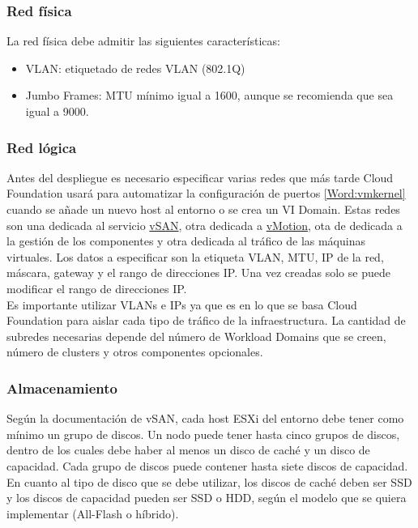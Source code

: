 \subsubsection{Red física}
\label{subsubsec:redFisica}
La red física debe admitir las siguientes características:
\begin{itemize}
    \item VLAN: etiquetado de redes VLAN (802.1Q)
    \item Jumbo Frames: MTU mínimo igual a 1600, aunque se recomienda que sea igual a 9000.
\end{itemize}

\subsubsection{Red lógica}
\label{subsubsec:redLogicaCF}
Antes del despliegue es necesario especificar varias redes que más tarde Cloud Foundation usará para automatizar la configuración de puertos \ref{Word:vmkernel} cuando se añade un nuevo host al entorno o se crea un VI Domain. Estas redes son  una dedicada al servicio \underline{vSAN}, otra dedicada a \underline{vMotion}, ota de dedicada a la gestión de los componentes y otra dedicada al tráfico de las máquinas virtuales. Los datos a especificar son la etiqueta VLAN, MTU, IP de la red, máscara, gateway y el rango de direcciones IP. Una vez creadas solo se puede modificar el rango de direcciones IP.\\
Es importante utilizar VLANs e IPs ya que es en lo que se basa Cloud Foundation para aislar cada tipo de tráfico de la infraestructura. La cantidad de subredes necesarias depende del número de Workload Domains que se creen, número de clusters y otros componentes opcionales.

\subsubsection{Almacenamiento}
Según la documentación de vSAN, cada host ESXi del entorno debe tener como mínimo un grupo de discos. Un nodo puede tener hasta cinco grupos de discos, dentro de los cuales debe haber al menos un disco de caché y un disco de capacidad. Cada grupo de discos puede contener hasta siete discos de capacidad.
En cuanto al tipo de disco que se debe utilizar, los discos de caché deben ser SSD y los discos de capacidad pueden ser SSD o HDD, según el modelo que se quiera implementar (All-Flash o híbrido).



